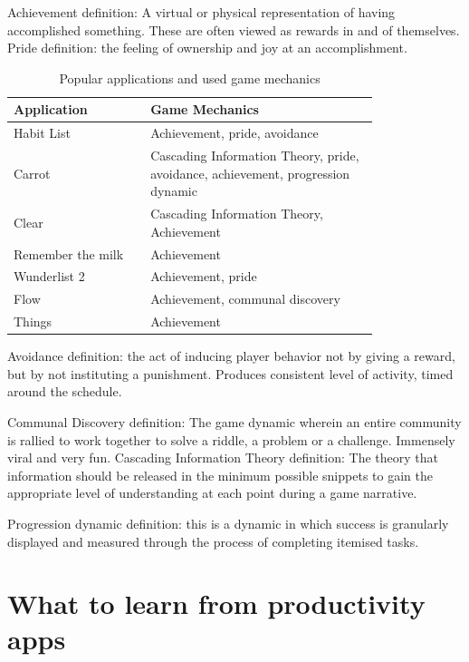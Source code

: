 Achievement definition: A virtual or physical representation of having accomplished something. These are often viewed as rewards in and of themselves.
Pride definition: the feeling of ownership and joy at an accomplishment.

\begin{longtable}{|p{0.3\linewidth}|p{0.5\linewidth}|}
\caption{Popular applications and used game mechanics}
\label{tab:appsandmech}\\
\hline
\bf Application &  \bf Game Mechanics \\
\hline
\endhead
Habit List & Achievement, pride, avoidance \\
\hline
Carrot & Cascading Information Theory, pride, avoidance, achievement, progression dynamic \\
\hline
Clear & Cascading Information Theory, Achievement \\
\hline
Remember the milk & Achievement \\
\hline
Wunderlist 2 & Achievement, pride \\
\hline
Flow & Achievement, communal discovery \\
\hline
Things & Achievement\\
\hline
\end{longtable}

Avoidance definition:  the act of inducing player behavior not by giving a reward, but by not instituting a punishment. Produces consistent level of activity, timed around the schedule.

Communal Discovery definition: The game dynamic wherein an entire community is rallied to work together to solve a riddle, a problem or a challenge. Immensely viral and very fun.
Cascading Information Theory definition: The theory that information should be released in the minimum possible snippets to gain the appropriate level of understanding at each point during a game narrative.

Progression dynamic definition: this is a dynamic in which success is granularly displayed and measured through the process of completing itemised tasks.

\section{What to learn from productivity apps}


